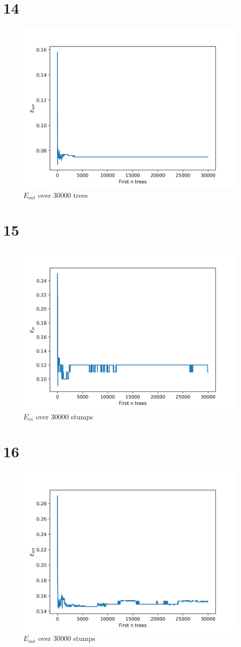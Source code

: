 \documentclass[fleqn,a4paper,12pt]{article}
\begin{document}
\section*{14}

\begin{figure}[H]
\centering
\includegraphics[width=0.75\linewidth]{tree-eout.png}
\caption{$E_{out}$ over 30000 trees}
\label{fig:tree-eout}
\end{figure}

\section*{15}

\begin{figure}[H]
\centering
\includegraphics[width=0.75\linewidth]{stump-ein.png}
\caption{$E_{in}$ over 30000 stumps}
\label{fig:stump-ein}
\end{figure}

\section*{16}

\begin{figure}[H]
\centering
\includegraphics[width=0.75\linewidth]{stump-eout.png}
\caption{$E_{out}$ over 30000 stumps}
\label{fig:stump-eout}
\end{figure}
\end{document}
